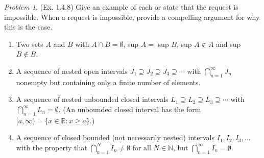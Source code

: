 \documentclass[11pt,twoside, reqno, align]{amsart}
\theoremstyle{remark}
\newtheorem{Prob}{Problem}
\def\R{\mathbb R}
\def\N{\mathbb N}
\begin{document}
\begin{Prob}(Ex. 1.4.8)
Give an example of each or state that the request is impossible. When a request is impossible, provide a compelling argument for why this is the case.
\begin{enumerate}[label=(\alph*)]
    \item Two sets $A$ and $B$ with $A \cap B = \emptyset$, sup $A =$ sup $B$, sup $A \not\in A$ and sup $B \not\in B$.
    \item A sequence of nested open intervals $J_1 \supseteq J_2 \supseteq J_3 \supseteq \cdots$ with $\bigcap_{n=1}^\infty J_n$ nonempty but containing only a finite number of elements. 
    \item A sequence of nested unbounded closed intervals $L_1 \supseteq L_2 \supseteq L_3 \supseteq \cdots$ with $\bigcap_{n=1}^\infty L_n = \emptyset$. (An unbounded closed interval has the form $[a,\infty) = \{x \in \R : x \geq a\}$.) 
    \item A sequence of closed bounded (not necessarily nested) intervals $I_1,I_2,I_3,\ldots$ with the property that $\bigcap_{n=1}^N I_n \neq \emptyset$ for all $N \in \N$, but $\bigcap_{n=1}^\infty I_n = \emptyset$.
\end{enumerate}
\end{Prob}
\end{document}
